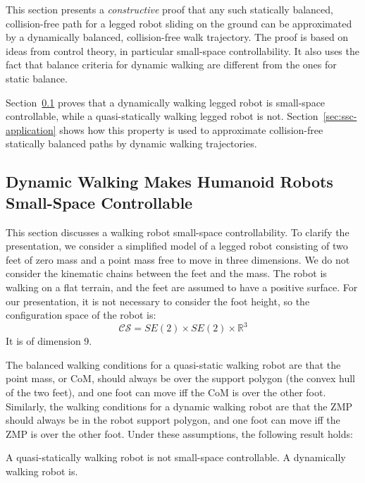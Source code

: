 This section presents a \textit{constructive} proof that any such
statically balanced, collision-free path for a legged robot sliding on
the ground can be approximated by a dynamically balanced,
collision-free walk trajectory.  The proof is based on ideas from
control theory, in particular small-space controllability. It also
uses the fact that balance criteria for dynamic walking are different
from the ones for static balance.

Section~\ref{sec:humanoid-ssc} proves that a dynamically walking
legged robot is small-space controllable, while a quasi-statically
walking legged robot is not. Section~\ref{sec:ssc-application} shows
how this property is used to approximate collision-free statically
balanced paths by dynamic walking trajectories.

\subsection{Dynamic Walking Makes Humanoid Robots Small-Space Controllable}
\label{sec:humanoid-ssc}

This section discusses a walking robot small-space controllability. To
clarify the presentation, we consider a simplified model of a legged
robot consisting of two feet of zero mass and a point mass free to
move in three dimensions.  We do not consider the kinematic chains
between the feet and the mass. The robot is walking on a flat terrain,
and the feet are assumed to have a positive surface. For our
presentation, it is not necessary to consider the foot height, so the
configuration space of the robot is:
\[
\mathcal{CS} = SE(2) \times SE(2) \times \mathbb{R}^3
\]
It is of dimension 9.

The balanced walking conditions for a quasi-static walking robot are
that the point mass, or CoM, should always be over the support polygon
(the convex hull of the two feet), and one foot can move iff the CoM
is over the other foot. Similarly, the walking conditions for a
dynamic walking robot are that the ZMP should always be in the robot
support polygon, and one foot can move iff the ZMP is over the other
foot. Under these assumptions, the following result holds:

\begin{theorem}
\label{thm:humanoid-ssc}
A quasi-statically walking robot is not small-space controllable. A
dynamically walking robot is.
\end{theorem}

